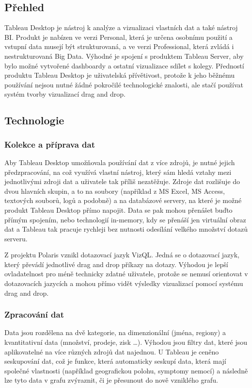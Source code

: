 \documentclass[czech,BP]{thesiskiv}
\begin{document}
 \subsection{Přehled}
 Tableau Desktop je nástroj k analýze a vizualizaci vlastních dat a také nástroj BI. Produkt je nabízen ve verzi Personal, která je určena osobnímu použití a vstupní data musejí být strukturovaná, a ve verzi Professional, která zvládá i nestrukturovaná Big Data. Výhodné je spojení s produktem Tableau Server, aby bylo možné vytvořené dashboardy a ostatní vizualizace sdílet s kolegy. Předností produktu Tableau Desktop je uživatelská přívětivost, protože k jeho běžnému používání nejsou nutné žádné pokročilé technologické znalosti, ale stačí používat systém tvorby vizualizací drag and drop. 
 
 \subsection{Technologie}
 \subsubsection{Kolekce a příprava dat}
 Aby Tableau Desktop umožňovala používání dat z více zdrojů, je nutné jejich předzpracování, na což využívá vlastní nástroj, který sám hledá vztahy mezi jednotlivými zdroji dat a uživatele tak příliš nezatěžuje. Zdroje dat rozlišuje do dvou hlavních skupin, a to na soubory (například z MS Excel, MS Access, textových souborů, logů a podobně) a na databázové servery, na které je možné produkt Tableau Desktop přímo napojit. Data se pak mohou přenášet buďto přímým spojením, nebo technologií in-memory, kdy se přenáší jen virtuální obraz dat a Tableau tak pracuje rychleji bez nutnosti odesílání velkého množství dotazů serveru.


 Z projektu Polaris vznikl dotazovací jazyk VizQL\texttrademark. Jedná se o dotazovací jazyk, který převádí jednotlivé drag and drop příkazy na dotazy.\cite{VizQL} Výhodou je lepší ovladatelnost pro méně technicky zdatné uživatele, protože se nemusí orientovat v dotazovacích jazycích a mohou přímo vidět výsledky vizualizací pomocí systému drag and drop.
 
 \subsubsection{Zpracování dat}
 Data jsou rozdělena na dvě kategorie, na dimenzionální (jména, regiony) a kvantitativní data (množství, prodeje, zisk …). Výhodou jsou filtry dat, které jsou aplikovatelné na více různých zdrojů dat najednou. U Tableau je ceněno seskupování dat, což je funkce, která automaticky seskupí data, která mají společné vlastnosti (například geografickou polohu, symptomy nemocí) a následně lze tyto data v grafu zvýraznit, či je přesunout do nově vzniklého grafu.\cite{TableauDimensions}
  
\end{document}
